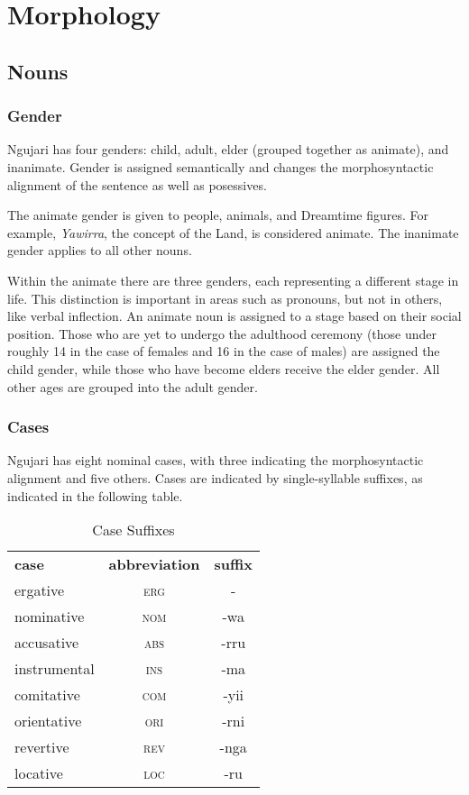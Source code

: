\chapter{Morphology}

\section{Nouns}

\subsection{Gender}

Ngujari has four genders: child, adult, elder (grouped together as animate), and
inanimate. Gender is assigned semantically and changes the morphosyntactic
alignment of the sentence as well as posessives.

The animate gender is given to people, animals, and Dreamtime figures. For
example, \textit{Yawirra}, the concept of the Land, is considered animate. The
inanimate gender applies to all other nouns.

Within the animate there are three genders, each representing a different stage
in life. This distinction is important in areas such as pronouns, but not in
others, like verbal inflection. An animate noun is assigned to a stage based on
their social position. Those who are yet to undergo the adulthood ceremony
(those under roughly 14 in the case of females and 16 in the case of males) are
assigned the child gender, while those who have become elders receive the elder
gender. All other ages are grouped into the adult gender.

\subsection{Cases}

Ngujari has eight nominal cases, with three indicating the morphosyntactic
alignment and five others. Cases are indicated by single-syllable suffixes, as
indicated in the following table.

\begin{table}[h]
\centering
\begin{tabular}{lcc}
\textbf{case} & \textbf{abbreviation} & \textbf{suffix}\\
ergative & \textsc{erg} & -\\
nominative & \textsc{nom} & -wa\\
accusative & \textsc{abs} & -rru\\
instrumental & \textsc{ins} & -ma\\
comitative & \textsc{com} & -yii\\
orientative & \textsc{ori} & -rni\\
revertive & \textsc{rev} & -nga\\
locative & \textsc{loc} & -ru\\
\end{tabular}
\caption{Case Suffixes}
\end{table}

